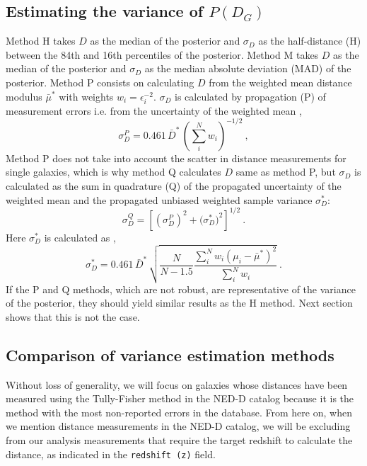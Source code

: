 \documentclass[a4paper,fleqn,usenatbib]{mnras}
\begin{document}
\subsection{Estimating the variance of $P(D_G)$}
\label{sec:meth} 

Method H takes $D$ as the median of the posterior and $\sigma_D$ as the half-distance (H) between the 84th and 16th percentiles of the posterior. Method M takes $D$ as the median of the posterior and $\sigma_D$ as the median absolute deviation (MAD) of the posterior. Method P consists on calculating $D$ from the weighted mean distance modulus $\bar{\mu}^*$ with weights $w_i=\epsilon_i^{-2}$. $\sigma_D$ is calculated by propagation (P) of measurement errors  i.e. from the uncertainty of the weighted mean \citep{cosmicflows},
\begin{equation}
\sigma_D^P=0.461\,\bar{D}^*\,\left(\sum_i^Nw_i\right)^{-1/2} \ ,
\end{equation}
Method P does not take into account the scatter in distance measurements for single galaxies, which is why method Q calculates $D$ same as method P, but $\sigma_D$ is calculated as the sum in quadrature (Q) of the propagated uncertainty of the weighted mean and the propagated unbiased weighted sample variance $\sigma_D^*$:
\begin{equation}
\sigma_D^Q=\left[ \left(\sigma_D^P\right)^2+\Big(\sigma_D^*\Big)^2\right]^{1/2} \ .
\end{equation}
Here $\sigma^*_D$ is calculated as  \citep{wstdev},
\begin{equation}
\sigma^*_D=0.461\,\bar{D}^*\,\sqrt{\frac{N}{N-1.5}\frac{\sum_i^Nw_i(\mu_i-\bar{\mu}^*)^2}{\sum_i^Nw_i}}\ .
\end{equation}
If the P and Q methods, which are not robust, are representative of the variance of the posterior, they should yield similar results as the H method. Next section shows that this is not the case.

\subsection{Comparison of variance estimation methods}
\label{sec:comp} 


Without loss of generality, we will focus on galaxies whose distances have been measured using the Tully-Fisher method in the NED-D catalog because it is the method with the most non-reported errors in the database. From here on, when we mention distance measurements in the NED-D catalog, we will be excluding from our analysis measurements that require the target redshift to calculate the distance, as indicated in the \texttt{redshift (z)} field. \\
\end{document}
